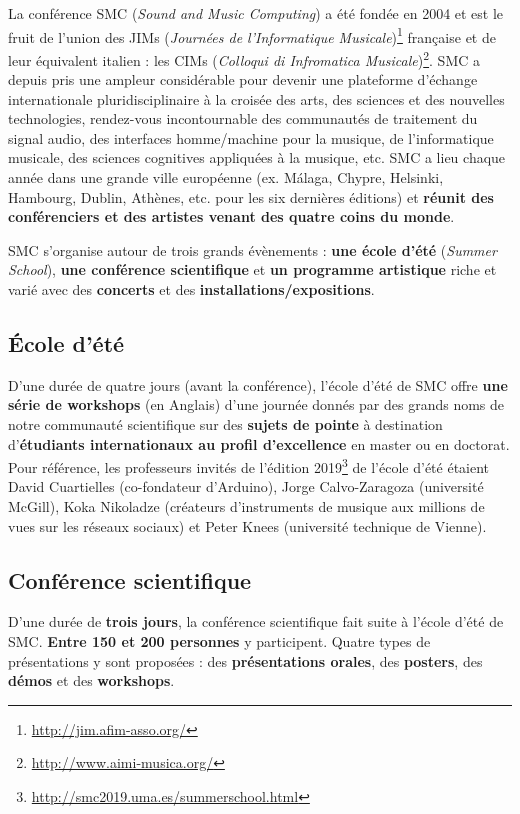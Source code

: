 \documentclass[fontsize=12pt]{scrartcl} %
\numberwithin{equation}{section} %
\numberwithin{figure}{section} %
\numberwithin{table}{section} %
\begin{document}
La conférence SMC (\textit{Sound and Music Computing}) a été fondée en 2004 et est le fruit de l'union des JIMs (\textit{Journées de l'Informatique Musicale})\footnote{\url{http://jim.afim-asso.org/}} française et de leur équivalent italien : les CIMs (\textit{Colloqui di Infromatica Musicale})\footnote{\url{http://www.aimi-musica.org/}}. SMC a depuis pris une ampleur considérable pour devenir une plateforme d’échange internationale pluridisciplinaire à la croisée des arts, des sciences et des nouvelles technologies, rendez-vous incontournable des communautés de traitement du signal audio, des interfaces homme/machine pour la musique, de l'informatique musicale, des sciences cognitives appliquées à la musique, etc. SMC a lieu chaque année dans une grande ville européenne (ex. Málaga, Chypre, Helsinki, Hambourg, Dublin, Athènes, etc. pour les six dernières éditions) et \textbf{réunit des conférenciers et des artistes venant des quatre coins du monde}.

SMC s'organise autour de trois grands évènements : \textbf{une école d'été} (\textit{Summer School}), \textbf{une conférence scientifique} et \textbf{un programme artistique} riche et varié avec des \textbf{concerts} et des \textbf{installations/expositions}.

\subsection{École d'été}

D'une durée de quatre jours (avant la conférence), l'école d'été de SMC offre \textbf{une série de workshops} (en Anglais) d'une journée donnés par des grands noms de notre communauté scientifique sur des \textbf{sujets de pointe} à destination d'\textbf{étudiants internationaux au profil d'excellence} en master ou en doctorat. Pour référence, les professeurs invités de l'édition 2019\footnote{\url{http://smc2019.uma.es/summerschool.html}} de l'école d'été étaient David Cuartielles (co-fondateur d'Arduino), Jorge Calvo-Zaragoza (université McGill), Koka Nikoladze (créateurs d'instruments de musique aux millions de vues sur les réseaux sociaux) et Peter Knees (université technique de Vienne). 

\subsection{Conférence scientifique}

D'une durée de \textbf{trois jours}, la conférence scientifique fait suite à l'école d'été de SMC. \textbf{Entre 150 et 200 personnes} y participent. Quatre types de présentations y sont proposées : des \textbf{présentations orales}, des \textbf{posters}, des \textbf{démos} et des \textbf{workshops}. 
\end{document}
